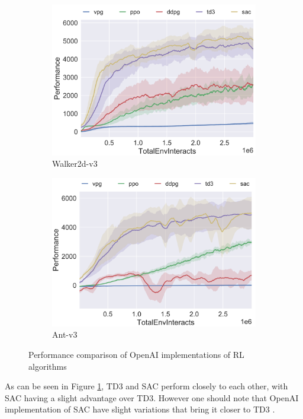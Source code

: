 \documentclass[12pt,twoside]{report}
\begin{document}
\begin{figure}[h]
\begin{subfigure}[b]{0.4\textwidth}
         \includegraphics[width=\textwidth]{figures/OpenAI benchmarks/walker pt.png}
         \caption{Walker2d-v3}
     \end{subfigure}
     \quad
     \begin{subfigure}[b]{0.4\textwidth}
         \centering
         \includegraphics[width=\textwidth]{figures/OpenAI benchmarks/ant pt.png}
         \caption{Ant-v3}
     \end{subfigure}
        \caption{Performance comparison of OpenAI implementations of RL algorithms \cite{openai:bench}}
        \label{fig:openAI-comparisons}
\end{figure}

As can be seen in Figure \ref{fig:openAI-comparisons}, TD3 and SAC perform closely to each other, with SAC having a slight advantage over TD3. However one should note that OpenAI implementation of SAC have slight variations that bring it closer to TD3 \cite{openai:sac-code}.
\end{document}
